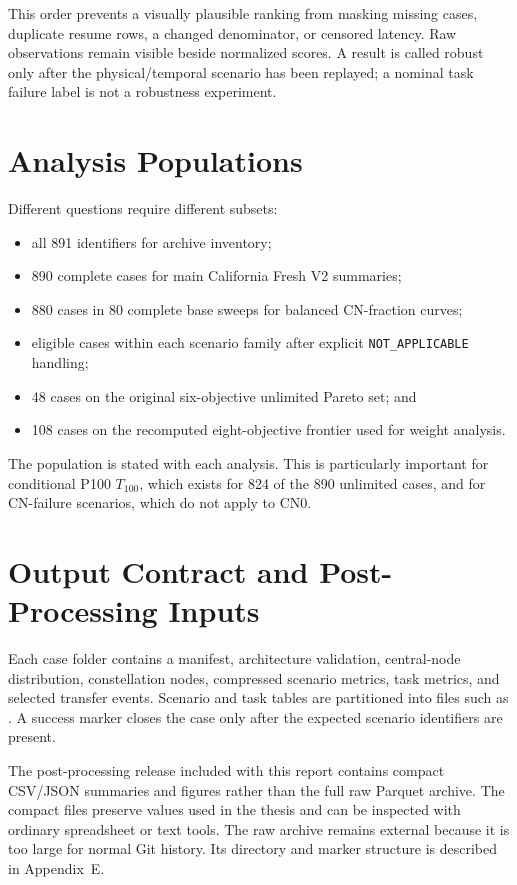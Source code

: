 This order prevents a visually plausible ranking from masking missing cases, duplicate resume rows, a changed denominator, or censored latency. Raw observations remain visible beside normalized scores. A result is called robust only after the physical/temporal scenario has been replayed; a nominal task failure label is not a robustness experiment.

\section{Analysis Populations}

Different questions require different subsets:

\begin{itemize}
\item all 891 identifiers for archive inventory;
\item 890 complete cases for main California Fresh V2 summaries;
\item 880 cases in 80 complete base sweeps for balanced CN-fraction curves;
\item eligible cases within each scenario family after explicit \texttt{NOT\_APPLICABLE} handling;
\item 48 cases on the original six-objective unlimited Pareto set; and
\item 108 cases on the recomputed eight-objective frontier used for weight analysis.
\end{itemize}

The population is stated with each analysis. This is particularly important for conditional P100 $T_{100}$, which exists for 824 of the 890 unlimited cases, and for CN-failure scenarios, which do not apply to CN0.

\section{Output Contract and Post-Processing Inputs}

Each case folder contains a manifest, architecture validation, central-node distribution, constellation nodes, compressed scenario metrics, task metrics, and selected transfer events. Scenario and task tables are partitioned into files such as . A success marker closes the case only after the expected scenario identifiers are present.

The post-processing release included with this report contains compact CSV/JSON summaries and figures rather than the full raw Parquet archive. The compact files preserve values used in the thesis and can be inspected with ordinary spreadsheet or text tools. The raw archive remains external because it is too large for normal Git history. Its directory and marker structure is described in Appendix~E.

